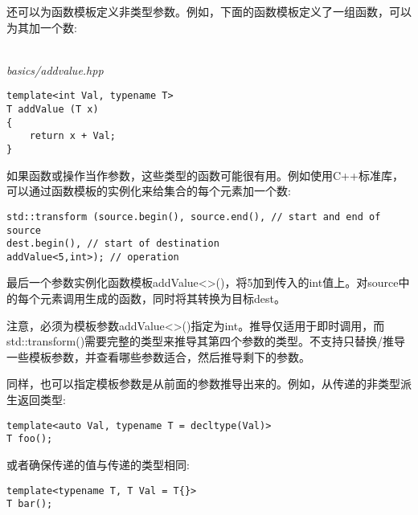 还可以为函数模板定义非类型参数。例如，下面的函数模板定义了一组函数，可以为其加一个数:

\hspace*{\fill} \\ %
\noindent
\textit{basics/addvalue.hpp}
\begin{lstlisting}[style=styleCXX]
template<int Val, typename T>
T addValue (T x)
{
	return x + Val;
}
\end{lstlisting}

如果函数或操作当作参数，这些类型的函数可能很有用。例如使用C++标准库，可以通过函数模板的实例化来给集合的每个元素加一个数:

\begin{lstlisting}[style=styleCXX]
std::transform (source.begin(), source.end(), // start and end of source
dest.begin(), // start of destination
addValue<5,int>); // operation
\end{lstlisting}

最后一个参数实例化函数模板addValue<>()，将5加到传入的int值上。对source中的每个元素调用生成的函数，同时将其转换为目标dest。

注意，必须为模板参数addValue<>()指定为int。推导仅适用于即时调用，而std::transform()需要完整的类型来推导其第四个参数的类型。不支持只替换/推导一些模板参数，并查看哪些参数适合，然后推导剩下的参数。

同样，也可以指定模板参数是从前面的参数推导出来的。例如，从传递的非类型派生返回类型:

\begin{lstlisting}[style=styleCXX]
template<auto Val, typename T = decltype(Val)>
T foo();
\end{lstlisting}

或者确保传递的值与传递的类型相同:

\begin{lstlisting}[style=styleCXX]
template<typename T, T Val = T{}>
T bar();
\end{lstlisting}































